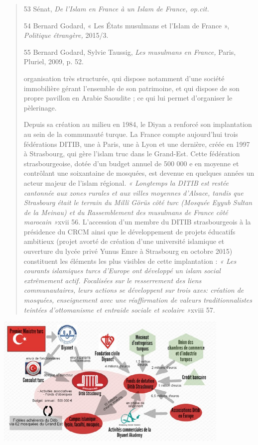 \begin{quote}
53 Sénat, \emph{De l'Islam en France à un Islam de France, op.cit.}

54 Bernard Godard, « Les États musulmans et l'Islam de France »,
\emph{Politique étrangère,} 2015/3.

55 Bernard Godard, Sylvie Taussig, \emph{Les musulmans en France,}
Paris, Pluriel, 2009, p. 52.



organisation très structurée, qui dispose notamment d'une société
immobilière gérant l'ensemble de son patrimoine, et qui dispose de son
propre pavillon en Arabie Saoudite ; ce qui lui permet d'organiser le
pèlerinage.

Depuis sa création au milieu en 1984, le Diyan a renforcé son
implantation au sein de la communauté turque. La France compte
aujourd'hui trois fédérations DITIB, une à Paris, une à Lyon et une
dernière, créée en 1997 à Strasbourg, qui gère l'islam truc dans le
Grand-Est. Cette fédération strasbourgeoise, dotée d'un budget annuel de
500 000 e en moyenne et contrôlant une soixantaine de mosquées, est
devenue en quelques années un acteur majeur de l'islam régional. \emph{«
Longtemps la DITIB est restée cantonnée aux zones rurales et aux villes
moyennes d'Alsace, tandis que Strasbourg était le terrain du Millî Görüs
côté turc (Mosquée Eyyub Sultan de la Meinau) et du Rassemblement des
musulmans de France côté marocain »}xvii 56. L'accession d'un membre du
DITIB strasbourgeois à la présidence du CRCM ainsi que le développement
de projets éducatifs ambitieux (projet avorté de création d'une
université islamique et ouverture du lycée privé Yunus Emre à Strasbourg
en octobre 2015) constituent les éléments les plus visibles de cette
implantation : \emph{« Les courants islamiques turcs d'Europe ont
développé un islam social extrêmement actif. Focalisées sur le
resserrement des liens communautaires, leurs actions se développent sur
trois axes: création de mosquées, enseignement avec une réaffirmation de
valeurs traditionnalistes teintées d'ottomanisme et entraide sociale et
scolaire »}xviii 57.
\end{quote}

\includegraphics[width=4.43662in,height=2.5in]{ImageIslamFrance/media/image8.jpeg}

